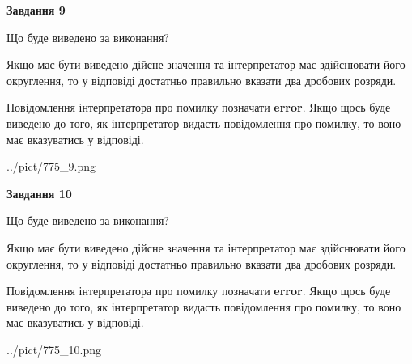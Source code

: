 \documentclass[12pt, ukrainian]{article}
\begin{document}
{\begin {Large}
{\begin {center}\textbf{Завдання 9}\end {center}}\par
Що буде виведено за виконання? \par

Якщо має бути виведено дійсне значення та інтерпретатор має здійснювати його округлення, 
то у відповіді достатньо правильно вказати два дробових розряди.

Повідомлення інтерпретатора про помилку позначати \textbf{error}.
Якщо щось буде виведено до того, як інтерпретатор видасть повідомлення про помилку, 
то воно має вказуватись у відповіді. \par

\begin{center}
	{../pict/775_9.png}
\end{center}
\newpage

{\begin {center}\textbf{Завдання 10}\end {center}}\par
Що буде виведено за виконання? \par

Якщо має бути виведено дійсне значення та інтерпретатор має здійснювати його округлення, 
то у відповіді достатньо правильно вказати два дробових розряди.

Повідомлення інтерпретатора про помилку позначати \textbf{error}.
Якщо щось буде виведено до того, як інтерпретатор видасть повідомлення про помилку, 
то воно має вказуватись у відповіді. \par

\begin{center}
	{../pict/775_10.png}
\end{center}
\newpage

\end {Large}}
\end{document}
